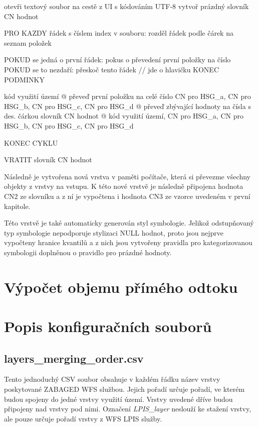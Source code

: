 \documentclass[a4paper,oneside,12pt]{book}
\begin{document}
\begin{pseudocode}[style=mypseudocode, caption={Vytvoření slovníku z CSV souboru},label={kod:cncsv}]
otevři textový soubor na cestě z UI s kódováním UTF-8
vytvoř prázdný slovník CN hodnot

PRO KAZDY řádek s číslem index v souboru:
    rozděl řádek podle čárek na seznam položek

    POKUD se jedná o první řádek:
        pokus o převedení první položky na číslo
        POKUD se to nezdaří:
            přeskoč tento řádek  // jde o hlavičku
    KONEC PODMINKY

    kód využití území @ převeď první položku na celé číslo 
    CN pro HSG_a, CN pro HSG_b, CN pro HSG_c, CN pro HSG_d @ převeď zbývající hodnoty na čísla s des. čárkou
    slovník CN hodnot @ kód využití území, CN pro HSG_a, CN pro HSG_b, CN pro HSG_c, CN pro HSG_d

KONEC CYKLU

VRATIT slovník CN hodnot
\end{pseudocode}
\hspace{10mm}Následně je vytvořena nová vrstva v paměti počítače, která si převezme všechny objekty z vrstvy na vstupu. K této nové vrstvě je následně připojena hodnota CN2 ze slovníku a z ní je vypočtena i hodnota CN3 ze vzorce uvedeném v první kapitole.

\hspace{10mm}Této vrstvě je také automaticky generován styl symbologie. Jelikož odstupňovaný typ symbologie nepodporuje stylizaci NULL hodnot, proto jsou nejprve vypočteny hranice kvantilů a z nich jsou vytvořeny pravidla pro kategorizovanou symbologii doplněnou o pravidlo pro prázdné hodnoty.

\section{Výpočet objemu přímého odtoku} \label{runoff}
\section{Popis konfiguračních souborů} \label{config}
\subsection{layers\_merging\_order.csv} \label{layers_merging_order.csv}
\hspace{10mm}Tento jednoduchý CSV soubor obsahuje v každém řádku název vrstvy poskytované ZABAGED WFS službou. Jejich pořadí určuje pořadí, ve kterém budou spojeny do jedné vrstvy využití území. Vrstvy uvedené dříve budou připojeny nad vrstvy pod nimi. Označení \textit{LPIS\_layer} neslouží ke stažení vrstvy, ale pouze určuje pořadí vrstvy z WFS LPIS služby.
\end{document}
